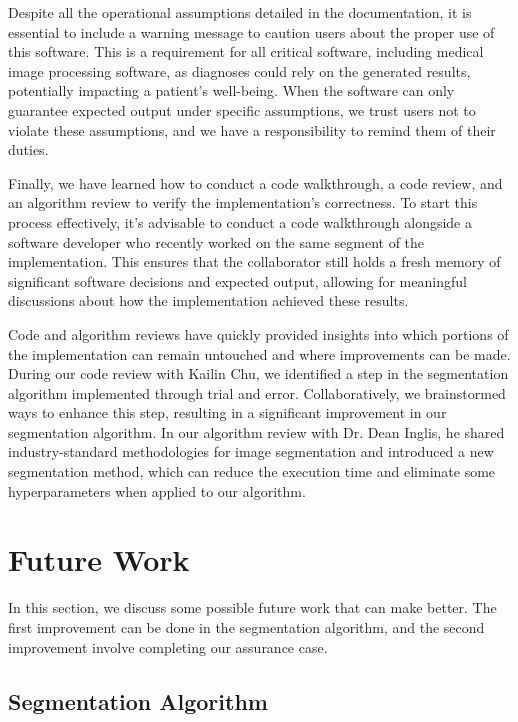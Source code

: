Despite all the operational assumptions detailed in the documentation, it is essential to include a warning message to caution users about the proper use of this software. This is a requirement for all critical software, including medical image processing software, as diagnoses could rely on the generated results, potentially impacting a patient's well-being. When the software can only guarantee expected output under specific assumptions, we trust users not to violate these assumptions, and we have a responsibility to remind them of their duties.

Finally, we have learned how to conduct a code walkthrough, a code review, and an algorithm review to verify the implementation's correctness. To start this process effectively, it's advisable to conduct a code walkthrough alongside a software developer who recently worked on the same segment of the implementation. This ensures that the collaborator still holds a fresh memory of significant software decisions and expected output, allowing for meaningful discussions about how the implementation achieved these results.

Code and algorithm reviews have quickly provided insights into which portions of the implementation can remain untouched and where improvements can be made. During our code review with Kailin Chu, we identified a step in the segmentation algorithm implemented through trial and error. Collaboratively, we brainstormed ways to enhance this step, resulting in a significant improvement in our segmentation algorithm. In our algorithm review with Dr. Dean Inglis, he shared industry-standard methodologies for image segmentation and introduced a new segmentation method, which can reduce the execution time and eliminate some hyperparameters when applied to our algorithm.


\section{Future Work}\label{fw}

In this section, we discuss some possible future work that can make \progname{} better. The first improvement can be done in the segmentation algorithm, and the second improvement involve completing our assurance case.

\subsection{Segmentation Algorithm}

